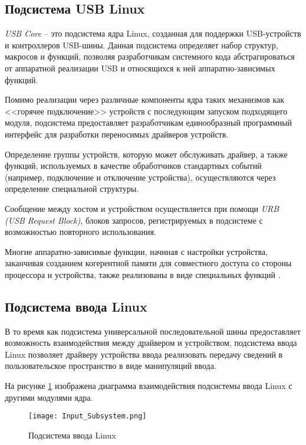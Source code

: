 \subsection{Подсистема USB Linux}

\emph{USB Core} -- это подсистема ядра Linux, созданная для поддержки USB-устройств и контроллеров USB-шины. 
Данная подсистема определяет набор структур, макросов и функций, позволяя разработчикам системного кода абстрагироваться
от аппаратной реализации USB и относящихся к ней аппаратно-зависимых функций.

Помимо реализации через различные компоненты ядра таких механизмов как <<горячее подключение>> устройств с последующим
запуском подходящего модуля, подсистема предоставляет разработчикам единообразный программный интерфейс для разработки
переносимых драйверов устройств.

Определение группы устройств, которую может обслуживать драйвер, а также функций, используемых в качестве обработчиков
стандартных событий (например, подключение и отключение устройства), осуществляются через определение специальной
структуры.

Сообщение между хостом и устройством осуществляется при помощи \emph{URB (USB Request Block)}, блоков запросов,
регистрируемых в подсистеме с возможностью повторного использования.

Многие аппаратно-зависимые функции, начиная с настройки устройства, заканчивая созданием когерентной памяти 
для совместного доступа со стороны процессора и устройства, также реализованы в виде специальных функций \cite{usbapi}.

\subsection{Подсистема ввода Linux}

В то время как подсистема универсальной последовательной шины предоставляет возможность взаимодействия между драйвером и устройством,
подсистема ввода Linux позволяет драйверу устройства ввода реализовать передачу сведений в пользовательское пространство
в виде манипуляций ввода.

На рисунке \ref{input-core} изображена диаграмма взаимодействия подсистемы ввода Linux с другими модулями ядра.

\begin{figure}[H]
    \centering
    \texttt{[image: Input\_Subsystem.png]}
    \caption{Подсистема ввода Linux}
    \label{input-core}
\end{figure}


